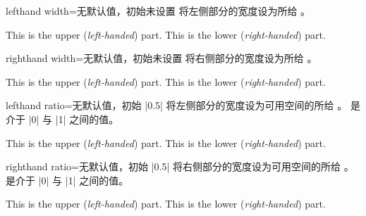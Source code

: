 \begin{docTcbKey}{lefthand width}{=}{无默认值，初始未设置}
  将左侧部分的宽度设为所给 。
\begin{dispExample}

\begin{tcolorbox}[title=My title,sidebyside,lefthand width=3cm]
This is the upper (\textit{left-handed}) part.
\tcblower
This is the lower (\textit{right-handed}) part.
\end{tcolorbox}
\end{dispExample}
\end{docTcbKey}

\enlargethispage*{1cm}
\begin{docTcbKey}{righthand width}{=}{无默认值，初始未设置}
  将右侧部分的宽度设为所给 。
\begin{dispExample}

\begin{tcolorbox}[title=My title,sidebyside,righthand width=3cm]
This is the upper (\textit{left-handed}) part.
\tcblower
This is the lower (\textit{right-handed}) part.
\end{tcolorbox}
\end{dispExample}
\end{docTcbKey}

\clearpage
\begin{docTcbKey}{lefthand ratio}{=}{无默认值，初始 |0.5|}
  将左侧部分的宽度设为可用空间的所给 。
  是介于 |0| 与 |1| 之间的值。
\begin{dispExample}

\begin{tcolorbox}[title=My title,sidebyside,lefthand ratio=0.25]
This is the upper (\textit{left-handed}) part.
\tcblower
This is the lower (\textit{right-handed}) part.
\end{tcolorbox}
\end{dispExample}
\end{docTcbKey}


\begin{docTcbKey}{righthand ratio}{=}{无默认值，初始 |0.5|}
  将右侧部分的宽度设为可用空间的所给 。
  是介于 |0| 与 |1| 之间的值。
\begin{dispExample}

\begin{tcolorbox}[title=My title,sidebyside,righthand ratio=0.25]
This is the upper (\textit{left-handed}) part.
\tcblower
This is the lower (\textit{right-handed}) part.
\end{tcolorbox}
\end{dispExample}
\end{docTcbKey}


